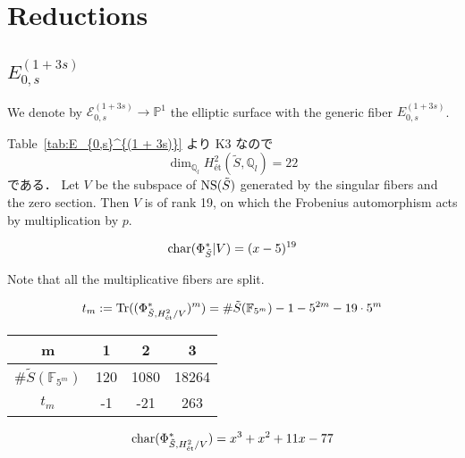 \documentclass[main]{subfiles}
\begin{document}
\chapter{Reductions}
\label{chap:reduction}

\section{$E_{0,s}^{(1 + 3s)}$}
We denote by $\mathcal{E}_{0,s}^{(1 + 3s)}\to \mathbb{P}^1$ the elliptic surface with the generic fiber $E_{0,s}^{(1 + 3s)}$.

Table~\ref{tab:E_{0,s}^{(1 + 3s)}} より K3 なので
\begin{equation}
    \dim_{\mathbb{Q}_{l}} H_{\text{\'et}}^{2}(\tilde{S}, \mathbb{Q}_{l}) = 22
\end{equation}
である．
Let $V$ be the subspace of $\operatorname{NS}(\tilde{S})$ generated by the singular fibers and the zero section.
Then $V$ is of rank 19, on which the Frobenius automorphism acts by multiplication by $p$.

\begin{equation}
    \operatorname{char} (\Phi_{\tilde{S}}^{*} | V) = (x - 5)^{19}
\end{equation}

Note that all the multiplicative fibers are split.

\begin{equation}
    t_{m} := \operatorname{Tr}((\Phi_{\tilde{S},H_{\text{\'et}}^{2} / V}^{*})^{m}) = \# \tilde{S}(\mathbb{F}_{5^{m}}) - 1 - 5^{2m} - 19 \cdot 5^{m}
\end{equation}

\begin{table}[h]
    \centering
    \begin{tabular}{|c|c|c|c|}
        \hline
        m                                & 1   & 2    & 3     \\
        \hline
        $\# \tilde{S}(\mathbb{F}_{5^m})$ & 120 & 1080 & 18264 \\
        \hline
        $t_m$                            & -1  & -21  & 263   \\
        \hline
    \end{tabular}
    \label{tab:sample}
\end{table}

\begin{equation}
    \operatorname{char}(\Phi_{\tilde{S},H_{\text{\'et}}^{2} / V}^{*}) = x^{3} + x^{2} + 11 x - 77
\end{equation}
\end{document}
